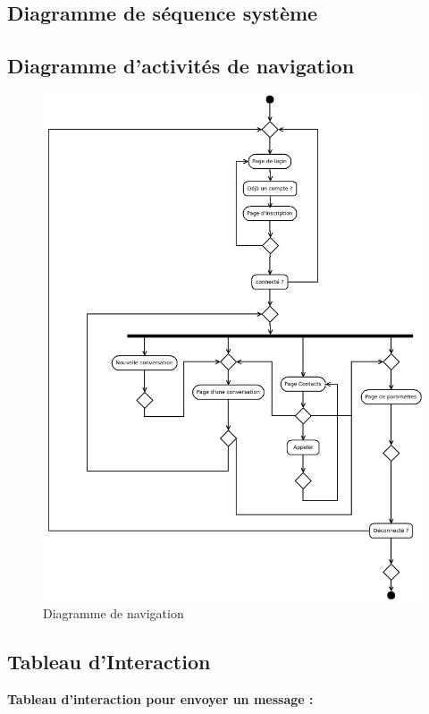 \documentclass[a4paper,12pt]{article}
\begin{document}
\subsection{Diagramme de séquence système}

\subsection{Diagramme d'activités de navigation}

\begin{figure}[H]
	\centerline{\includegraphics[width=16.5cm]{diagramme_navigationVERSION2.png}}
	\caption{Diagramme de navigation}
\end{figure}

\subsection{Tableau d’Interaction}

\textbf{Tableau d’interaction pour envoyer un message :} \\
\end{document}
